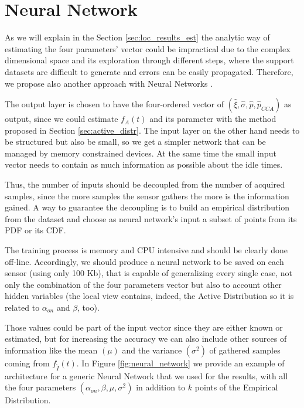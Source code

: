 \section{Neural Network} \label{sec:loc_nn}

As we will explain in the Section \ref{sec:loc_results_est} the analytic way of estimating the four parameters' vector could be impractical due to the complex dimensional space and its exploration through different steps, where the support datasets are difficult to generate and errors can be easily propagated. Therefore, we propose also another approach with Neural Networks \cite{NN-Theo, NN-App}.

The output layer is chosen to have the four-ordered vector of $(\hat{\xi}, \hat{\sigma}, \hat{p}, \hat{p}_{CCA})$  as output, since we could estimate $f_A(t)$ and its parameter with the method proposed in Section \ref{sec:active_distr}. The input layer on the other hand needs to be structured but also be small, so we get a simpler network that can be managed by memory constrained devices. At the same time the small input vector needs to contain as much information as possible about the idle times.

Thus, the number of inputs should be decoupled from the number of acquired samples, since the more samples the sensor gathers the more is the information gained. A way to guarantee the decoupling is to build an empirical distribution from the dataset and choose as neural network's input a subset of points from its \ac{PDF} or its \ac{CDF}.

The training process is memory and \acs{CPU} intensive and should be clearly done off-line. Accordingly, we should produce a neural network to be saved on each sensor (using only 100 Kb), that is capable of generalizing every single case, not only the combination of the four parameters vector but also to account other hidden variables (the local view contains, indeed, the Active Distribution so it is related to $\alpha_{on}$ and $\beta$, too).

Those values could be part of the input vector since they are either known or estimated, but for increasing the accuracy we can also include other sources of information like the mean $(\mu)$ and the variance $(\sigma^2)$ of gathered samples coming from $f_{\tilde{I}}(t)$. In Figure \ref{fig:neural_network} we provide an example of architecture for a generic Neural Network that we used for the results, with all the four parameters $(\alpha_{on}, \beta, \mu, \sigma^2)$ in addition to $k$ points of the Empirical Distribution.

